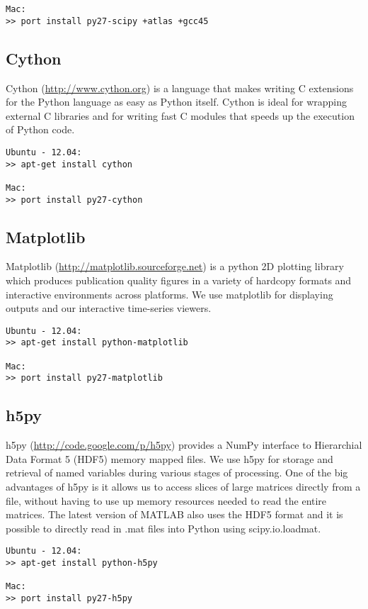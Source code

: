 \begin{verbatim}
Mac: 
>> port install py27-scipy +atlas +gcc45
\end{verbatim}

\subsection{Cython}
Cython (\url{http://www.cython.org}) is a language that makes writing C extensions for the Python language as easy as Python itself. Cython is ideal for wrapping external C libraries and for writing fast C modules that speeds up the execution of Python code.
\begin{verbatim}
Ubuntu - 12.04:
>> apt-get install cython

Mac:
>> port install py27-cython
\end{verbatim}

\subsection{Matplotlib}
Matplotlib (\url{http://matplotlib.sourceforge.net}) is a python 2D plotting library which produces publication quality figures in a variety of hardcopy formats and interactive environments across platforms. We use matplotlib for displaying outputs and our interactive time-series viewers.
\begin{verbatim}
Ubuntu - 12.04:
>> apt-get install python-matplotlib

Mac:
>> port install py27-matplotlib
\end{verbatim}

\subsection{h5py}
h5py (\url{http://code.google.com/p/h5py}) provides a NumPy interface to Hierarchial Data Format 5 (HDF5) memory mapped files. We use h5py for storage and retrieval of named variables during various stages of processing. One of the big advantages of h5py is it allows us to access slices of large matrices directly from a file, without having to use up memory resources needed to read the entire matrices. The latest version of MATLAB \textsuperscript{\textregistered} also uses the HDF5 format and it is possible to directly read in .mat files into Python using scipy.io.loadmat. 
\begin{verbatim}
Ubuntu - 12.04:
>> apt-get install python-h5py

Mac: 
>> port install py27-h5py
\end{verbatim}

